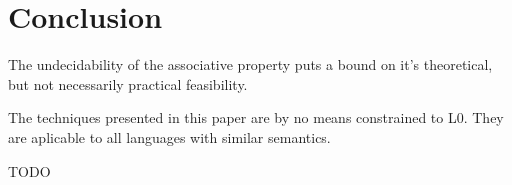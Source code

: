 \section{Conclusion}

The undecidability of the associative property puts a bound on it's
theoretical, but not necessarily practical feasibility.

The techniques presented in this paper are by no means constrained to L0. They
are aplicable to all languages with similar semantics.

TODO
